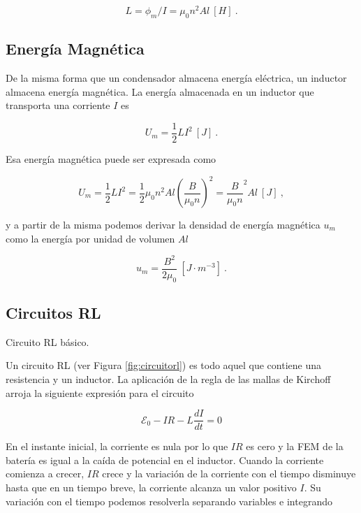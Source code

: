 \documentclass{tufte-handout}
\begin{document}
\begin{equation}
L = \phi_m / I = \mu_0 n^2 Al~[H]~.
\end{equation}

\subsection{Energía Magnética}

De la misma forma que un condensador almacena energía eléctrica, un inductor almacena energía magnética. La energía almacenada en un inductor que transporta una corriente $I$ es

\begin{equation}
U_m = \displaystyle\frac{1}{2}LI^2~[J]~.
\end{equation}

Esa energía magnética puede ser expresada como

\begin{equation}
U_m = \displaystyle\frac{1}{2}LI^2 = \displaystyle\frac{1}{2}\mu_0n^2Al(\displaystyle\frac{B}{\mu_0 n})^2 = \displaystyle\frac{B}{\mu_0 n}^2Al~[J]~,
\end{equation}

y a partir de la misma podemos derivar la densidad de energía magnética $u_m$ como la energía por unidad de volumen $Al$

\begin{equation}
u_m = \displaystyle\frac{B^2}{2\mu_0}~[J\cdot m^{-3}]~.
\end{equation}

\subsection{Circuitos RL}

\begin{marginfigure}%
    \centering
    
    \bigskip
    \caption{Circuito RL básico.}
    \label{fig:circuitorl}
\end{marginfigure}

Un circuito RL (ver Figura \ref{fig:circuitorl}) es todo aquel que contiene una resistencia y un inductor. La aplicación de la regla de las mallas de Kirchoff arroja la siguiente expresión para el circuito

\begin{equation}
\mathcal{E}_0 - IR - L\displaystyle\frac{dI}{dt} = 0
\end{equation}

En el instante inicial, la corriente es nula por lo que $IR$ es cero y la FEM de la batería es igual a la caída de potencial en el inductor. Cuando la corriente comienza a crecer, $IR$ crece y la variación de la corriente con el tiempo disminuye  hasta que en un tiempo breve, la corriente alcanza un valor positivo $I$. Su variación con el tiempo podemos resolverla separando variables e integrando
\end{document}
